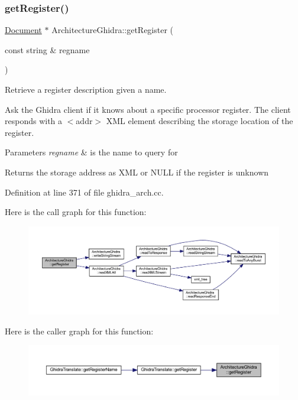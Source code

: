 \subsubsection{\texorpdfstring{getRegister()}{getRegister()}}
{\footnotesize\ttfamily \mbox{\hyperlink{class_document}{Document}} $\ast$ Architecture\+Ghidra\+::get\+Register (\begin{DoxyParamCaption}\item[{const string \&}]{regname }\end{DoxyParamCaption})}



Retrieve a register description given a name. 

Ask the Ghidra client if it knows about a specific processor register. The client responds with a $<$addr$>$ X\+ML element describing the storage location of the register. 
\begin{DoxyParams}{Parameters}
{\em regname} & is the name to query for \\
\hline
\end{DoxyParams}
\begin{DoxyReturn}{Returns}
the storage address as X\+ML or N\+U\+LL if the register is unknown 
\end{DoxyReturn}


Definition at line 371 of file ghidra\+\_\+arch.\+cc.

Here is the call graph for this function\+:
\nopagebreak
\begin{figure}[H]
\begin{center}
\leavevmode
\includegraphics[width=350pt]{class_architecture_ghidra_ad1e8a5eaefce58038fc774a6083818e8_cgraph}
\end{center}
\end{figure}
Here is the caller graph for this function\+:
\nopagebreak
\begin{figure}[H]
\begin{center}
\leavevmode
\includegraphics[width=350pt]{class_architecture_ghidra_ad1e8a5eaefce58038fc774a6083818e8_icgraph}
\end{center}
\end{figure}
\mbox{\label{class_architecture_ghidra_a37f48166235bff1cf154a989aa22bfde}} 

